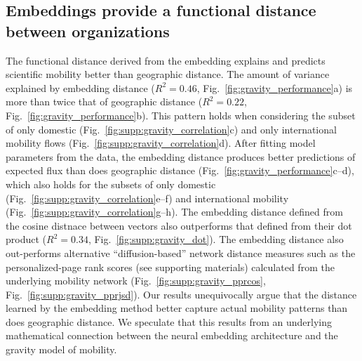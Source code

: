\documentclass[12pt]{article} %
\begin{document}
%
%
%
\subsection*{Embeddings provide a functional distance between organizations}

The functional distance derived from the embedding explains and predicts scientific mobility better than geographic distance.
The amount of variance explained by embedding distance ($R^{2} = 0.46$, Fig.~\ref{fig:gravity_performance}a) is more than twice that of geographic distance ($R^{2} = 0.22$, Fig.~\ref{fig:gravity_performance}b).
This pattern holds when considering the subset of only domestic (Fig.~\ref{fig:supp:gravity_correlation}c) and only international mobility flows (Fig.~\ref{fig:supp:gravity_correlation}d).
After fitting model parameters from the data, the embedding distance produces better predictions of expected flux than does geographic distance (Fig.~\ref{fig:gravity_performance}c--d), which also holds for the subsets of only domestic (Fig.~\ref{fig:supp:gravity_correlation}e--f) and international mobility (Fig.~\ref{fig:supp:gravity_correlation}g--h).
The embedding distance defined from the cosine distnace between vectors also outperforms that defined from their dot product ($R^{2} = 0.34$, Fig.~\ref{fig:supp:gravity_dot}).
The embedding distance also out-performs alternative ``diffusion-based'' network distance measures such as the personalized-page rank scores (see supporting materials) calculated from the underlying mobility network (Fig.~\ref{fig:supp:gravity_pprcos}, Fig.~\ref{fig:supp:gravity_pprjsd}).
Our results unequivocally argue that the distance learned by the embedding method better capture actual mobility patterns than does geographic distance. 
We speculate that this results from an underlying mathematical connection between the neural embedding architecture and the gravity model of mobility. 
\end{document}
